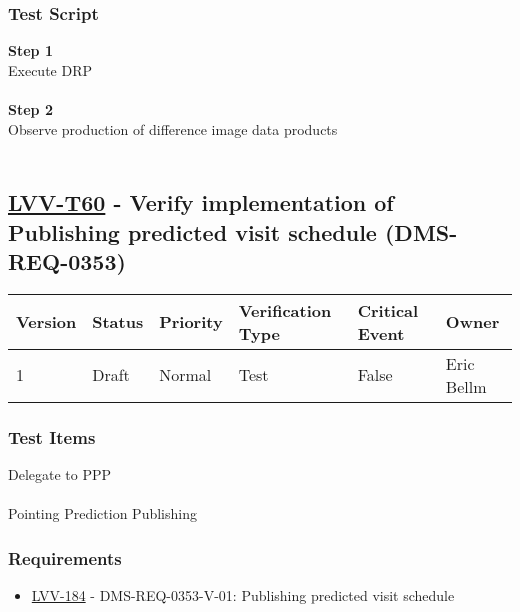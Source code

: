 \hypertarget{test-script-36}{%
\subsubsection{Test Script}\label{test-script-36}}

\textbf{Step 1}\\
Execute DRP\\
~\\
\textbf{Step 2}\\
Observe production of difference image data products\\
~\\

\hypertarget{lvv-t60---verify-implementation-of-publishing-predicted-visit-schedule-dms-req-0353}{%
\subsection{\texorpdfstring{\href{https://jira.lsstcorp.org/secure/Tests.jspa\#/testCase/LVV-T60}{LVV-T60}
- Verify implementation of Publishing predicted visit schedule
(DMS-REQ-0353)}{LVV-T60 - Verify implementation of Publishing predicted visit schedule (DMS-REQ-0353)}}\label{lvv-t60---verify-implementation-of-publishing-predicted-visit-schedule-dms-req-0353}}

\begin{longtable}[]{@{}llllll@{}}
\toprule
Version & Status & Priority & Verification Type & Critical Event &
Owner\tabularnewline
\midrule
\endhead
1 & Draft & Normal & Test & False & Eric Bellm\tabularnewline
\bottomrule
\end{longtable}

\hypertarget{test-items-36}{%
\subsubsection{Test Items}\label{test-items-36}}

Delegate to PPP\\
~\\
Pointing Prediction Publishing

\hypertarget{requirements-37}{%
\subsubsection{Requirements}\label{requirements-37}}

\begin{itemize}
\tightlist
\item
  \href{https://jira.lsstcorp.org/browse/LVV-184}{LVV-184} -
  DMS-REQ-0353-V-01: Publishing predicted visit schedule
\end{itemize}

